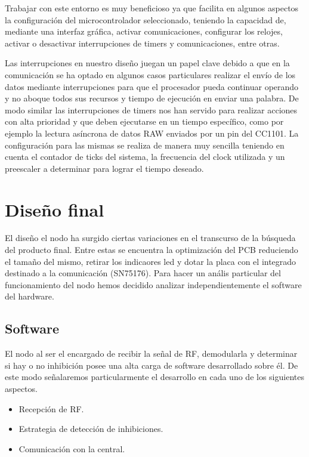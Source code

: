 Trabajar con este entorno es muy beneficioso ya que facilita en algunos aspectos la configuración del microcontrolador 
seleccionado, teniendo la capacidad de, mediante una interfaz gráfica, activar comunicaciones, configurar los relojes,
activar o desactivar interrupciones de timers y comunicaciones, entre otras. \par 
Las interrupciones en nuestro diseño juegan un papel clave debido a que en la comunicación se ha optado en algunos casos
particulares realizar el envío de los datos mediante interrupciones para que el procesador pueda continuar operando y no aboque 
todos sus recursos y tiempo de ejecución en enviar una palabra. De modo similar las interrupciones de timers nos han servido
para realizar acciones con alta prioridad y que deben ejecutarse en un tiempo específico, como por ejemplo la lectura asíncrona
de datos RAW enviados por un pin del CC1101. La configuración para las mismas se realiza de manera muy sencilla teniendo en 
cuenta el contador de ticks del sistema, la frecuencia del clock utilizada y un preescaler a determinar para lograr el tiempo
deseado. \par 

\section{Diseño final}

El diseño el nodo ha surgido ciertas variaciones en el transcurso de la búsqueda del producto final. Entre estas se encuentra
la optimización del PCB reduciendo el tamaño del mismo, retirar los indicaores led y dotar la placa con el integrado destinado 
a la comunicación (SN75176). Para hacer un anális particular del funcionamiento del nodo hemos decidido analizar independientemente
el software del hardware.

\subsection{Software}

El nodo al ser el encargado de recibir la señal de RF, demodularla y determinar si hay o no inhibición posee una alta carga 
de software desarrollado sobre él. De este modo señalaremos particularmente el desarrollo en cada uno de los siguientes 
aspectos.

\begin{itemize}
	\item Recepción de RF.
	\item Estrategia de detección de inhibiciones.
	\item Comunicación con la central.
\end{itemize}


